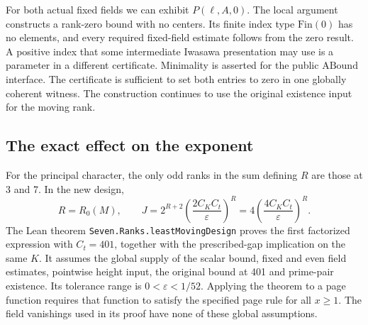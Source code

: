 \documentclass[12pt,letterpaper]{article}
\begin{document}
For both actual fixed fields we can exhibit \(P(\ell,A,0)\). The local argument constructs a rank-zero bound with no centers. Its finite index type \(\mathrm{Fin}(0)\) has no elements, and every required fixed-field estimate follows from the zero result. A positive index that some intermediate Iwasawa presentation may use is a parameter in a different certificate. Minimality is asserted for the public \(\mathrm{ABound}\) interface. The certificate is sufficient to set both entries to zero in one globally coherent witness. The construction continues to use the original existence input for the moving rank.

\subsection{The exact effect on the exponent}
For the principal character, the only odd ranks in the sum defining \(R\) are those at 3 and 7. In the new design,
\[
  R=R_0(M),\qquad
  J=2^{R+2}\left(\frac{2 C_K C_t}{\varepsilon}\right)^R
    =4\left(\frac{4 C_K C_t}{\varepsilon}\right)^R.
\]
The Lean theorem \texttt{Seven.Ranks.leastMovingDesign} proves the first factorized expression with \(C_t=401\), together with the prescribed-gap implication on the same \(K\). It assumes the global supply of the scalar bound, fixed and even field estimates, pointwise height input, the original bound at 401 and prime-pair existence. Its tolerance range is \(0<\varepsilon<1/52\). Applying the theorem to a page function requires that function to satisfy the specified page rule for all \(x\ge1\). The field vanishings used in its proof have none of these global assumptions.
\end{document}
